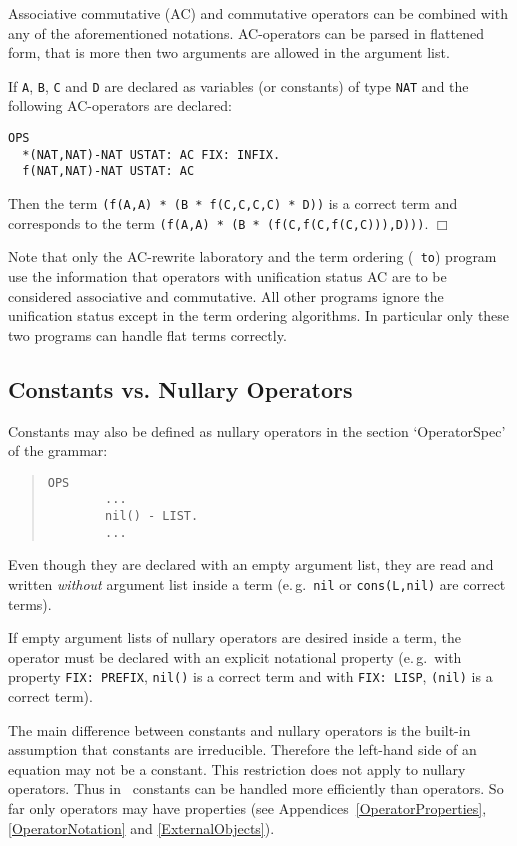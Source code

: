 Associative commutative (AC) and commutative operators can be  combined
with any of the aforementioned notations. 
AC-operators can be parsed in flattened form, that is more then two
arguments are allowed in the argument list.
\begin{example}
If {\tt A}, {\tt B}, {\tt C} and {\tt D} are declared as variables (or
constants) of type {\tt NAT} and the following AC-operators are declared:
\begin{verbatim}
OPS
  *(NAT,NAT)-NAT USTAT: AC FIX: INFIX.
  f(NAT,NAT)-NAT USTAT: AC
\end{verbatim}
Then the term {\tt (f(A,A) * (B * f(C,C,C,C) * D))} is a correct term
and corresponds to the term {\tt (f(A,A) * (B * (f(C,f(C,f(C,C))),D)))}.
\hfill $\Box$
\end{example}
Note that only the AC-rewrite laboratory and the term ordering ({\tt
to}) program use the information that
operators with unification status AC are to be considered 
associative and commutative.
All other programs ignore the unification status except in the term
ordering algorithms.
In particular only these two programs can handle flat terms correctly.

\subsection{Constants vs. Nullary Operators}
Constants may also be defined as nullary operators in
the section `OperatorSpec' of  the grammar:
\begin{quote}
\begin{verbatim}
OPS
        ...
        nil() - LIST.
        ...
\end{verbatim}
\end{quote}
Even though they are declared with an empty argument list,
they are read and written {\em without} argument list inside a term
(e.\,g.\ {\tt nil} or {\tt cons(L,nil)} are correct terms).

If empty argument lists of nullary operators are desired inside a term,
the operator must be declared with an explicit notational property
(e.\,g.\ with property {\tt FIX: PREFIX}, {\tt nil()} is a correct term
and with {\tt FIX: LISP}, {\tt (nil)} is a correct term).

The main difference between constants and nullary operators is the
built-in assumption that constants are irreducible.
Therefore the left-hand side of an equation may not be a constant.
This restriction does not apply to nullary operators.
Thus in \redux\  constants can be handled more efficiently than
operators.
So far only operators may have properties (see
Appendices~\ref{OperatorProperties},
\ref{OperatorNotation} and \ref{ExternalObjects}).

